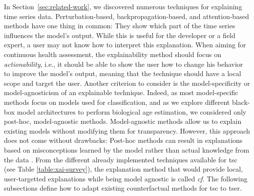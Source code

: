 In Section~\ref{sec:related-work}, we discovered numerous techniques for explaining time series data. Perturbation-based, backpropagation-based, and attention-based methods have one thing in common: They show which part of the time series influences the model's output. While this is useful for the developer or a field expert, a user may not know how to interpret this explanation. When aiming for continuous health assessment, the explainability method should focus on \textit{actionability}, i.e., it should be able to show the user how to change his behavior to improve the model's output, meaning that the technique should have a local scope and target the user. Another criterion to consider is the model-specificity or model-agnosticism of an explainable technique. Indeed, as most model-specific methods focus on models used for classification, and as we explore different black-box model architectures to perform biological age estimation, we considered only post-hoc, model-agnostic methods. Model-agnostic methods allow us to explain existing models without modifying them for transparency. However, this approach does not come without drawbacks: Post-hoc methods can result in explanations based on misconceptions learned by the model rather than actual knowledge from the data \cite{laugel_dangers_2019}. From the different already implemented techniques available for \gls{tsc} (see Table \ref{table:xai-survey}), the explanation method that would provide local, user-targetted explanations while being model agnostic is called \textit{\gls{cf}}. The following subsections define how to adapt existing counterfactual methods for \gls{tsc} to \gls{tser}.
 
